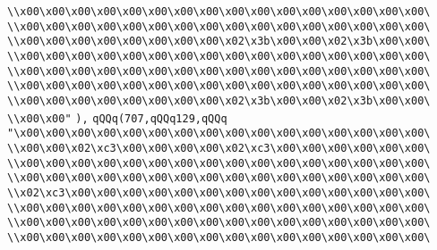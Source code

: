 \verb|\\x00\x00\x00\x00\x00\x00\x00\x00\x00\x00\x00\x00\x00\x00\x00\x00\|\newline
\verb|\\x00\x00\x00\x00\x00\x00\x00\x00\x00\x00\x00\x00\x00\x00\x00\x00\|\newline
\verb|\\x00\x00\x00\x00\x00\x00\x00\x00\x02\x3b\x00\x00\x02\x3b\x00\x00\|\newline
\verb|\\x00\x00\x00\x00\x00\x00\x00\x00\x00\x00\x00\x00\x00\x00\x00\x00\|\newline
\verb|\\x00\x00\x00\x00\x00\x00\x00\x00\x00\x00\x00\x00\x00\x00\x00\x00\|\newline
\verb|\\x00\x00\x00\x00\x00\x00\x00\x00\x00\x00\x00\x00\x00\x00\x00\x00\|\newline
\verb|\\x00\x00\x00\x00\x00\x00\x00\x00\x02\x3b\x00\x00\x02\x3b\x00\x00\|\newline
\verb|\\x00\x00"|\newline
\verb|),|\newline
\verb|qQQq(707,qQQq129,qQQq|\newline
\verb|"\x00\x00\x00\x00\x00\x00\x00\x00\x00\x00\x00\x00\x00\x00\x00\x00\|\newline
\verb|\\x00\x00\x02\xc3\x00\x00\x00\x00\x02\xc3\x00\x00\x00\x00\x00\x00\|\newline
\verb|\\x00\x00\x00\x00\x00\x00\x00\x00\x00\x00\x00\x00\x00\x00\x00\x00\|\newline
\verb|\\x00\x00\x00\x00\x00\x00\x00\x00\x00\x00\x00\x00\x00\x00\x00\x00\|\newline
\verb|\\x02\xc3\x00\x00\x00\x00\x00\x00\x00\x00\x00\x00\x00\x00\x00\x00\|\newline
\verb|\\x00\x00\x00\x00\x00\x00\x00\x00\x00\x00\x00\x00\x00\x00\x00\x00\|\newline
\verb|\\x00\x00\x00\x00\x00\x00\x00\x00\x00\x00\x00\x00\x00\x00\x00\x00\|\newline
\verb|\\x00\x00\x00\x00\x00\x00\x00\x00\x00\x00\x00\x00\x00\x00\x00\x00\|\newline
